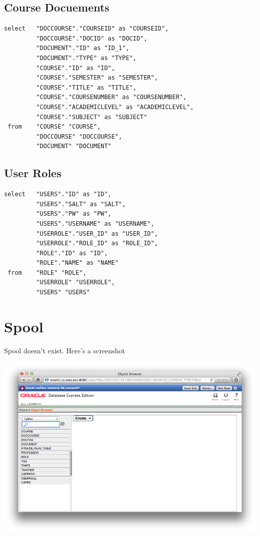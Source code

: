 \documentclass[11pt]{article}
\begin{document}
\subsection{Course Docuements}
\label{sec-5-5}



\begin{verbatim}
select   "DOCCOURSE"."COURSEID" as "COURSEID",
         "DOCCOURSE"."DOCID" as "DOCID",
         "DOCUMENT"."ID" as "ID_1",
         "DOCUMENT"."TYPE" as "TYPE",
         "COURSE"."ID" as "ID",
         "COURSE"."SEMESTER" as "SEMESTER",
         "COURSE"."TITLE" as "TITLE",
         "COURSE"."COURSENUMBER" as "COURSENUMBER",
         "COURSE"."ACADEMICLEVEL" as "ACADEMICLEVEL",
         "COURSE"."SUBJECT" as "SUBJECT" 
 from    "COURSE" "COURSE",
         "DOCCOURSE" "DOCCOURSE",
         "DOCUMENT" "DOCUMENT"
\end{verbatim}
\subsection{User Roles}
\label{sec-5-6}



\begin{verbatim}
select   "USERS"."ID" as "ID",
         "USERS"."SALT" as "SALT",
         "USERS"."PW" as "PW",
         "USERS"."USERNAME" as "USERNAME",
         "USERROLE"."USER_ID" as "USER_ID",
         "USERROLE"."ROLE_ID" as "ROLE_ID",
         "ROLE"."ID" as "ID",
         "ROLE"."NAME" as "NAME" 
 from    "ROLE" "ROLE",
         "USERROLE" "USERROLE",
         "USERS" "USERS"
\end{verbatim}
\section{Spool}
\label{sec-6}


  Spool doesn't exist. Here's a screenshot

  \includegraphics[width=.9\linewidth]{Spool.png}
\end{document}
